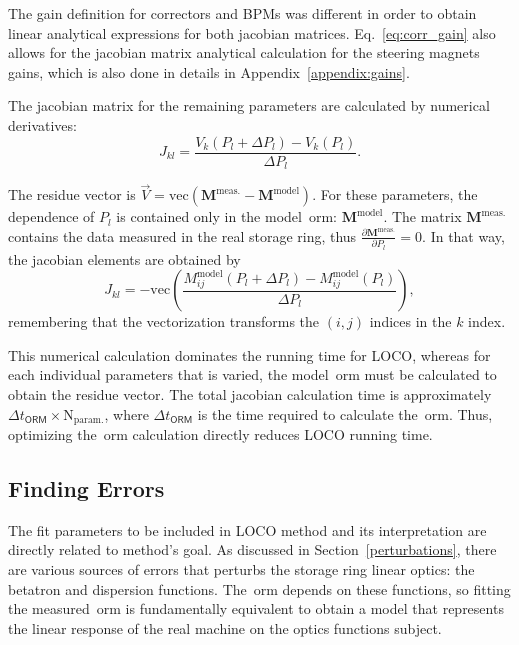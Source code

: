 The gain definition for correctors and BPMs was different in order to obtain linear analytical expressions for both jacobian matrices. Eq.~\eqref{eq:corr_gain} also allows for the jacobian matrix analytical calculation for the steering magnets gains, which is also done in details in Appendix~\ref{appendix:gains}. 

The jacobian matrix for the remaining parameters are calculated by numerical derivatives:
\begin{equation}
    J_{kl} = \dfrac{V_{k}\left(P_{l} + \Delta P_{l}\right) - V_{k}\left(P_{l}\right)}{\Delta P_{l}}.
\end{equation}

The residue vector is $\vec{V} = \mathrm{vec}\left(\mathbf{M}^{\mathrm{meas.}} - \mathbf{M}^{\mathrm{model}}\right)$. For these parameters, the dependence of $P_l$ is contained only in the model~\gls{orm}: $\mathbf{M}^{\mathrm{model}}$. The matrix $\mathbf{M}^{\mathrm{meas.}}$ contains the data measured in the real storage ring, thus $\frac{\partial\mathbf{M}^{\mathrm{meas.}}}{\partial P_l} = 0$. In that way, the jacobian elements are obtained by
\begin{equation}
    J_{kl} = -\mathrm{vec}\left(\dfrac{M_{ij}^{\mathrm{model}}\left(P_{l} + \Delta P_{l}\right) - M_{ij}^{\mathrm{model}}\left(P_{l}\right)}{\Delta P_{l}}\right),
\end{equation}
remembering that the vectorization transforms the $(i, j)$ indices in the $k$ index.

This numerical calculation dominates the running time for LOCO, whereas for each individual parameters that is varied, the model~\gls{orm} must be calculated to obtain the residue vector. The total jacobian calculation time is approximately $\Delta t_{\mathsf{ORM}} \times \mathrm{N}_{\mathrm{param.}}$, where $\Delta t_{\mathsf{ORM}}$ is the time required to calculate the~\gls{orm}. Thus, optimizing the~\gls{orm} calculation directly reduces LOCO running time. 
\subsection{Finding Errors}
The fit parameters to be included in LOCO method and its interpretation are directly related to method's goal. As discussed in Section~\ref{perturbations}, there are various sources of errors that perturbs the storage ring linear optics: the betatron and dispersion functions. The~\gls{orm} depends on these functions, so fitting the measured~\gls{orm} is fundamentally equivalent to obtain a model that represents the linear response of the real machine on the optics functions subject.

